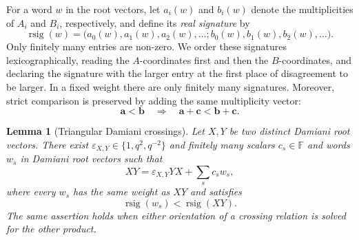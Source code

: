 \documentclass[11pt]{extarticle}
\newtheorem{lemma}[theorem]{Lemma}
\theoremstyle{definition}
\theoremstyle{remark}
\numberwithin{equation}{section}
\newcommand{\F}{\mathbb F}
\begin{document}
For a word $w$ in the root vectors, let $a_i(w)$ and $b_i(w)$ denote the
multiplicities of $A_i$ and $B_i$, respectively, and define its
\emph{real signature} by
\begin{equation}
\label{eq:real-signature}
 \operatorname{rsig}(w)
 =\bigl(a_0(w),a_1(w),a_2(w),\ldots;
        b_0(w),b_1(w),b_2(w),\ldots\bigr).
\end{equation}
Only finitely many entries are non-zero.  We order these signatures
lexicographically, reading the $A$-coordinates first and then the
$B$-coordinates, and declaring the signature with the larger entry at the
first place of disagreement to be larger.  In a fixed weight there are only
finitely many signatures.  Moreover, strict comparison is preserved by
adding the same multiplicity vector:
\begin{equation}
\label{eq:signature-additivity}
 \boldsymbol a<\boldsymbol b
 \quad\Longrightarrow\quad
 \boldsymbol a+\boldsymbol c<\boldsymbol b+\boldsymbol c.
\end{equation}

\begin{lemma}[Triangular Damiani crossings]
\label{lem:Damiani-triangular-crossings}
Let $X,Y$ be two distinct Damiani root vectors.  There exist
$\varepsilon_{X,Y}\in\{1,q^2,q^{-2}\}$ and finitely many scalars
$c_s\in\F$ and words $w_s$ in Damiani root vectors such that
\begin{equation}
\label{eq:Damiani-triangular-crossing}
 XY=\varepsilon_{X,Y}YX+\sum_s c_sw_s,
\end{equation}
where every $w_s$ has the same weight as $XY$ and satisfies
\[
 \operatorname{rsig}(w_s)<\operatorname{rsig}(XY).
\]
The same assertion holds when either orientation of a crossing relation is
solved for the other product.
\end{lemma}
\end{document}
